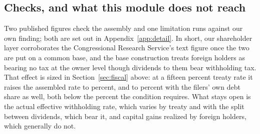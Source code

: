 \subsection{Checks, and what this module does not reach}

Two published figures check the assembly and one limitation runs against our own finding; both are set out in Appendix~\ref{app:detail}. In short, our shareholder layer corroborates the Congressional Research Service's text figure once the two are put on a common base, and the base construction treats foreign holders as bearing no tax at the owner level though dividends to them bear withholding tax. That effect is sized in Section~\ref{sec:fiscal} above: at a fifteen percent treaty rate it raises the assembled rate to  percent, and to  percent with the filers' own debt share as well, both below the  percent the condition requires. What stays open is the actual effective withholding rate, which varies by treaty and with the split between dividends, which bear it, and capital gains realized by foreign holders, which generally do not.
